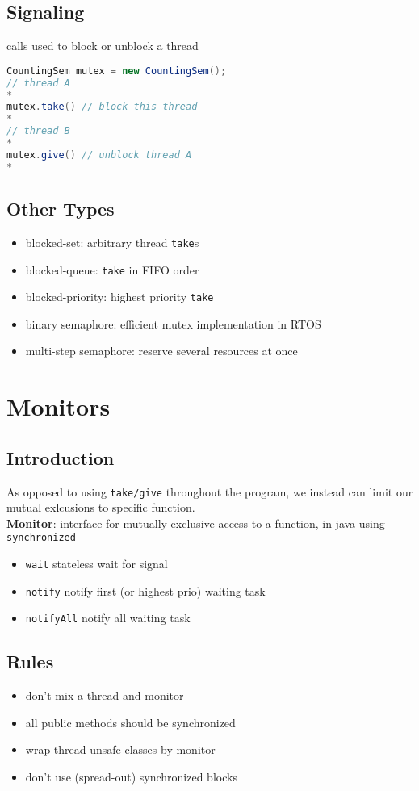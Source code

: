 \documentclass[]{article}
\theoremstyle{definition}
\begin{document}
	\subsection{Signaling}
	calls used to block or unblock a thread
	\begin{lstlisting}[language=Java]
CountingSem mutex = new CountingSem();
// thread A
*
mutex.take() // block this thread
*
// thread B
*
mutex.give() // unblock thread A
*
	\end{lstlisting}

	\subsection{Other Types}
	\begin{itemize}
		\item blocked-set: arbitrary thread \lstinline|take|s 
		\item blocked-queue: \lstinline|take| in FIFO order
		\item blocked-priority: highest priority \lstinline|take|
		\item binary semaphore: efficient mutex implementation in RTOS
		\item multi-step semaphore: reserve several resources at once
	\end{itemize}

	\section{Monitors}
	\subsection{Introduction}
	As opposed to using \lstinline|take/give| throughout the program, we instead can limit our mutual exlcusions to specific function. \\
	\textbf{Monitor}: interface for mutually exclusive access to a function, in java using \lstinline|synchronized|
	\begin{itemize}
		\item \lstinline|wait| stateless wait for signal
		\item \lstinline|notify| notify first (or highest prio) waiting task
		\item \lstinline|notifyAll| notify all waiting task
	\end{itemize}
	\subsection{Rules}
	\begin{itemize}
		\item don't mix a thread and monitor
		\item all public methods should be synchronized
		\item wrap thread-unsafe classes by monitor
		\item don't use (spread-out) synchronized blocks
	\end{itemize}
\end{document}

